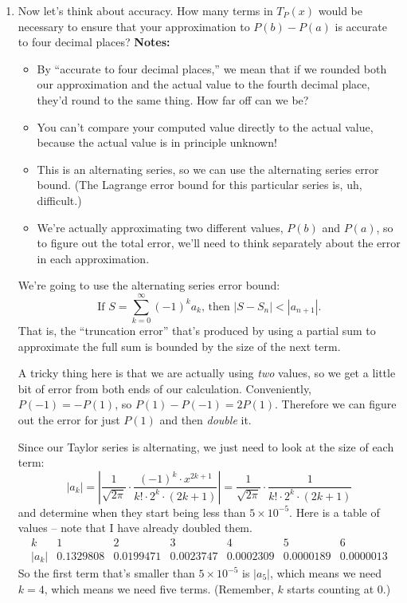 \begin{enumerate}[leftmargin=0pt]
    \begin{red}
    \[P(1) - P(-1) \approx \frac{1}{\sqrt{2\pi}}\cdot  \frac{479}{560} - \left( - \frac{1}{\sqrt{2\pi}}\cdot  \frac{479}{560}\right) \approx 0.34124 + 0.34124 = 0.68248.\]
    \end{red}
    \item Now let's think about accuracy. How many terms in $T_P(x)$ would be necessary to ensure that your approximation to $P(b)-P(a)$ is accurate to four decimal places? \textbf{Notes:}
    \begin{itemize}
        \item By ``accurate to four decimal places,'' we mean that if we rounded both our approximation and the actual value to the fourth decimal place, they'd round to the same thing. How far off can we be?
        \item You can't compare your computed value directly to the actual value, because the actual value is in principle unknown!
        \item This is an alternating series, so we can use the alternating series error bound. (The Lagrange error bound for this particular series is, uh, difficult.)
        \item We're actually approximating two different values, $P(b)$ and $P(a)$, so to figure out the total error, we'll need to think separately about the error in each approximation.
    \end{itemize} 
    
    \begin{red}
    We're going to use the alternating series error bound:
    \[\text{If } S = \sum_{k=0}^\infty (-1)^k a_k\text {, then }|S-S_n| < |a_{n+1}|.\]
    That is, the ``truncation error'' that's produced by using a partial sum to approximate the full sum is bounded by the size of the next term.

    A tricky thing here is that we are actually using \textit{two} values, so we get a little bit of error from both ends of our calculation. Conveniently, $P(-1) = -P(1)$, so $P(1) - P(-1) = 2P(1)$. Therefore we can figure out the error for just $P(1)$ and then \textit{double} it.
    
    Since our Taylor series is alternating, we just need to look at the size of each term:
    \[|a_k| = \left|\frac{1}{\sqrt{2\pi}} \cdot \frac{(-1)^k \cdot x^{2k+1} }{k!\cdot 2^k\cdot(2k+1)} \right| = \frac{1}{\sqrt{2\pi}} \cdot \frac{1}{k!\cdot 2^k\cdot(2k+1)}\] and determine when they start being less than $5\times 10^{-5}$. Here is a table of values -- note that I have already doubled them.
    \[
\begin{array}{c|c|c|c|c|c|c}
k     & 1         & 2         & 3         & 4         & 5         & 6         \\\hline
|a_k| & 0.1329808 & 0.0199471 & 0.0023747 & 0.0002309 & 0.0000189 & 0.0000013
\end{array}
    \]
    So the first term that's smaller than $5\times10^{-5}$ is $|a_5|$, which means we need $k=4$, which means we need five terms. (Remember, $k$ starts counting at 0.)


\end{red}
\end{enumerate}
